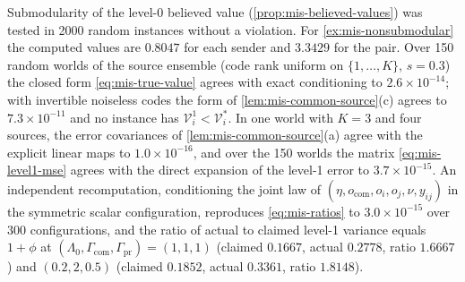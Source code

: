 \begin{numcheck}\label{chk:mis-values}
Submodularity of the level-0 believed value (\cref{prop:mis-believed-values}) was tested in 2000 random instances without a violation. For \cref{ex:mis-nonsubmodular} the computed values are $0.8047$ for each sender and $3.3429$ for the pair. Over 150 random worlds of the source ensemble (code rank uniform on $\{1,\dots,K\}$, $s=0.3$) the closed form \eqref{eq:mis-true-value} agrees with exact conditioning to $2.6\times10^{-14}$; with invertible noiseless codes the form of \cref{lem:mis-common-source}(c) agrees to $7.3\times10^{-11}$ and no instance has $\mathcal V^1_i<\mathcal V^\ast_i$. In one world with $K=3$ and four sources, the error covariances of \cref{lem:mis-common-source}(a) agree with the explicit linear maps to $1.0\times10^{-16}$, and over the 150 worlds the matrix \eqref{eq:mis-level1-mse} agrees with the direct expansion of the level-1 error to $3.7\times10^{-15}$. An independent recomputation, conditioning the joint law of $(\eta,o_{\mathrm{com}},o_i,o_j,\nu,y_{ij})$ in the symmetric scalar configuration, reproduces \eqref{eq:mis-ratios} to $3.0\times10^{-15}$ over 300 configurations, and the ratio of actual to claimed level-1 variance equals $1+\phi$ at $(\Lambda_0,\Gamma_{\mathrm{com}},\Gamma_{\mathrm{pr}})=(1,1,1)$ (claimed $0.1667$, actual $0.2778$, ratio $1.6667$) and $(0.2,2,0.5)$ (claimed $0.1852$, actual $0.3361$, ratio $1.8148$).
\end{numcheck}

